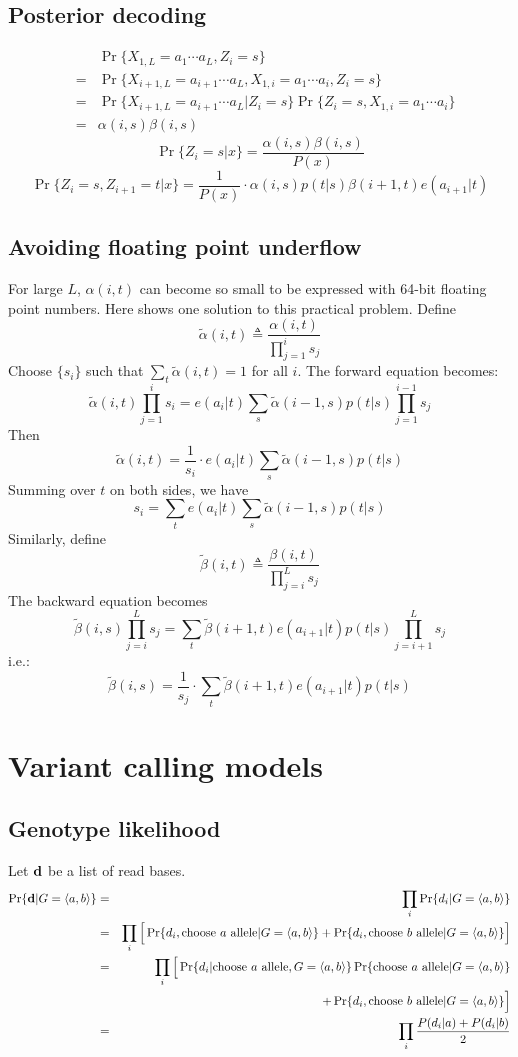 \documentclass[10pt]{article}
\begin{document}
\subsection{Posterior decoding}
\begin{eqnarray*}
&& \Pr\{X_{1,L}=a_1\cdots a_L,Z_i=s\}\\
&=&\Pr\{X_{i+1,L}=a_{i+1}\cdots a_L,X_{1,i}=a_1\cdots a_i,Z_i=s\}\\
&=&\Pr\{X_{i+1,L}=a_{i+1}\cdots a_L|Z_i=s\}\Pr\{Z_i=s,X_{1,i}=a_1\cdots a_i\}\\
&=&\alpha(i,s)\beta(i,s)
\end{eqnarray*}
$$
\Pr\{Z_i=s|x\}=\frac{\alpha(i,s)\beta(i,s)}{P(x)}
$$
$$
\Pr\{Z_i=s,Z_{i+1}=t|x\}=\frac{1}{P(x)}\cdot\alpha(i,s)p(t|s)\beta(i+1,t)e(a_{i+1}|t)
$$

\subsection{Avoiding floating point underflow}

For large $L$, $\alpha(i,t)$ can become so small to be expressed with 64-bit
floating point numbers. Here shows one solution to this practical problem.
Define
$$
\tilde{\alpha}(i,t)\triangleq\frac{\alpha(i,t)}{\prod_{j=1}^is_j}
$$
Choose $\{s_i\}$ such that $\sum_t\tilde{\alpha}(i,t)=1$ for all $i$. The
forward equation becomes:
$$
\tilde{\alpha}(i,t)\prod_{j=1}^is_i=e(a_i|t)\sum_s\tilde{\alpha}(i-1,s)p(t|s)\prod_{j=1}^{i-1}s_j
$$
Then
$$
\tilde{\alpha}(i,t)=\frac{1}{s_i}\cdot e(a_i|t)\sum_s\tilde{\alpha}(i-1,s)p(t|s)
$$
Summing over $t$ on both sides, we have
$$
s_i=\sum_te(a_i|t)\sum_s\tilde{\alpha}(i-1,s)p(t|s)
$$
Similarly, define
$$
\tilde{\beta}(i,t)\triangleq\frac{\beta(i,t)}{\prod_{j=i}^Ls_j}
$$
The backward equation becomes
$$
\tilde{\beta}(i,s)\prod_{j=i}^Ls_j=\sum_t\tilde{\beta}(i+1,t)e(a_{i+1}|t)p(t|s)\prod_{j=i+1}^Ls_j
$$
i.e.:
$$
\tilde{\beta}(i,s)=\frac{1}{s_j}\cdot\sum_t\tilde{\beta}(i+1,t)e(a_{i+1}|t)p(t|s)
$$

\newpage

\section{Variant calling models}

\subsection{Genotype likelihood}
Let ${\bf d}$ be a list of read bases.
\begin{eqnarray*}
\Pr\{{\bf d}|G=\langle a,b\rangle\}
&=&\prod_i\Pr\{d_i|G=\langle a,b\rangle\}\\
&=&\prod_i\Big[\Pr\{d_i,\mbox{choose $a$ allele}|G=\langle a,b\rangle\}+\Pr\{d_i,\mbox{choose $b$ allele}|G=\langle a,b\rangle\}\Big]\\
&=&\prod_i\Big[\Pr\{d_i|\mbox{choose $a$ allele},G=\langle a,b\rangle\}\Pr\{\mbox{choose $a$ allele}|G=\langle a,b\rangle\}\\
&&+\Pr\{d_i,\mbox{choose $b$ allele}|G=\langle a,b\rangle\}\Big]\\
&=&\prod_i\frac{P(d_i|a)+P(d_i|b)}{2}
\end{eqnarray*}
\end{document}
